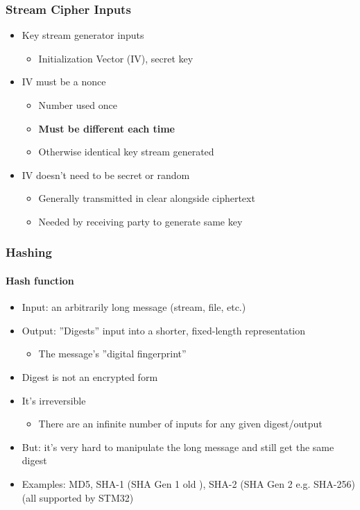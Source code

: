 \subsubsection{Stream Cipher Inputs}
\begin{itemize}
  \item Key stream generator inputs
        \begin{itemize}
          \item Initialization Vector (IV), secret key
        \end{itemize}
  \item IV must be a nonce
        \begin{itemize}
          \item Number used once
          \item \textbf{Must be different each time}
          \item Otherwise identical key stream generated
        \end{itemize}
  \item IV doesn't need to be secret or random
        \begin{itemize}
          \item Generally transmitted in clear alongside ciphertext
          \item Needed by receiving party to generate same key
        \end{itemize}
\end{itemize}

\subsubsection{Hashing}
\paragraph{Hash function}
\begin{itemize}
  \item Input: an arbitrarily long message (stream, file, etc.)
  \item Output: ''Digests'' input into a shorter, fixed-length representation
        \begin{itemize}
          \item The message's ''digital fingerprint''
        \end{itemize}
  \item Digest is not an encrypted form
  \item It's irreversible
        \begin{itemize}
          \item There are an infinite number of inputs for any given digest/output
        \end{itemize}
  \item But: it's very hard to manipulate the long message and still get the same digest
  \item Examples: MD5, SHA-1 (SHA Gen 1 old ), SHA-2 (SHA Gen 2 e.g. SHA-256) (all supported by STM32)
\end{itemize}

